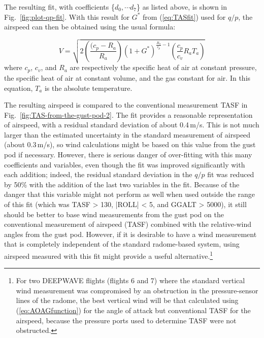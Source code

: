 \documentclass[12pt,twoside,english]{article}\usepackage[]{graphicx}\usepackage[]{color}
\let\OrgIndex\index
\renewcommand*{\index}[1]{\OrgIndex{#1}}
\begin{document}
The resulting fit, with coefficients \{$d_{0},\cdots d_{7}$\} as listed above, is shown in Fig.~\ref{fig:plot-qp-fit}. With this result for $G^{*}$ from (\ref{eq:TASfit}) used for $q/p$, the airspeed can then be obtained using the usual formula: 

\begin{equation}
V=\sqrt{2\left(\frac{(c_{p}-R_{a}}{R_{a}}\right)\left(1+G^{*}\right)^{\frac{R_{a}}{c_{p}}-1}\left(\frac{c_{p}}{c_{v}}R_{a}T_{a}\right)}\label{eq:TASformula} 
\end{equation}
where $c_{p}$, $c_{v}$, and $R_{a}$ are respectively the specific heat of air at constant pressure, the specific heat of air at constant volume, and the gas constant for air. In this equation, $T_{a}$ is the absolute temperature. 

The resulting airspeed is compared to the conventional measurement TASF in Fig.~\ref{fig:TAS-from-the-gust-pod-2}. The fit provides a reasonable representation of airspeed, with a residual standard deviation of about 0.4\,m/s. This is not much larger than the estimated uncertainty in the standard measurement of airspeed (about 0.3\,m/s), so wind calculations might be based on this value from the gust pod if necessary. However, there is serious danger of over-fitting with this many coefficients and variables, even though the fit was improved significantly with each addition; indeed, the residual standard deviation in the $q/p$ fit was reduced by 50\% with the addition of the last two variables in the fit. Because of the danger that this variable might not perform as well when  used outside the range of this fit (which was TASF > 130, |ROLL| < 5, and GGALT > 5000),  it still should be better to base wind measurements from the gust pod on the  conventional measurement of airspeed (TASF) combined with the relative-wind angles from the gust pod. However, if it is desirable to have a wind measurement that is completely independent of the standard radome-based system, using airspeed measured with this fit might provide a useful alternative.\footnote{For two DEEPWAVE flights (flights 6 and 7) where the standard vertical wind measurement was compromised by an obstruction in the pressure-sensor lines of the radome, the best vertical wind will be that calculated using (\ref{eq:AOAGfunction}) for the angle of attack but conventional TASF for the airspeed, because the pressure ports used to determine TASF were not obstructed.} 
\end{document}
